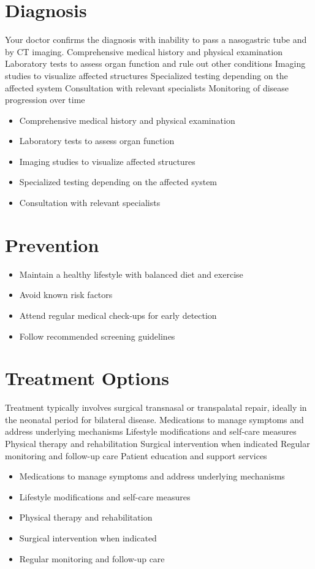 \section{Diagnosis}
Your doctor confirms the diagnosis with inability to pass a nasogastric tube and by CT imaging. Comprehensive medical history and physical examination Laboratory tests to assess organ function and rule out other conditions Imaging studies to visualize affected structures Specialized testing depending on the affected system Consultation with relevant specialists Monitoring of disease progression over time

\begin{itemize}[noitemsep]
  \item Comprehensive medical history and physical examination
  \item Laboratory tests to assess organ function
  \item Imaging studies to visualize affected structures
  \item Specialized testing depending on the affected system
  \item Consultation with relevant specialists
\end{itemize}
\section{Prevention}
\begin{itemize}[noitemsep]
  \item Maintain a healthy lifestyle with balanced diet and exercise
  \item Avoid known risk factors
  \item Attend regular medical check-ups for early detection
  \item Follow recommended screening guidelines
\end{itemize}
\section{Treatment Options}
Treatment typically involves surgical transnasal or transpalatal repair, ideally in the neonatal period for bilateral disease. Medications to manage symptoms and address underlying mechanisms Lifestyle modifications and self-care measures Physical therapy and rehabilitation Surgical intervention when indicated Regular monitoring and follow-up care Patient education and support services

\begin{itemize}[noitemsep]
  \item Medications to manage symptoms and address underlying mechanisms
  \item Lifestyle modifications and self-care measures
  \item Physical therapy and rehabilitation
  \item Surgical intervention when indicated
  \item Regular monitoring and follow-up care
\end{itemize}
